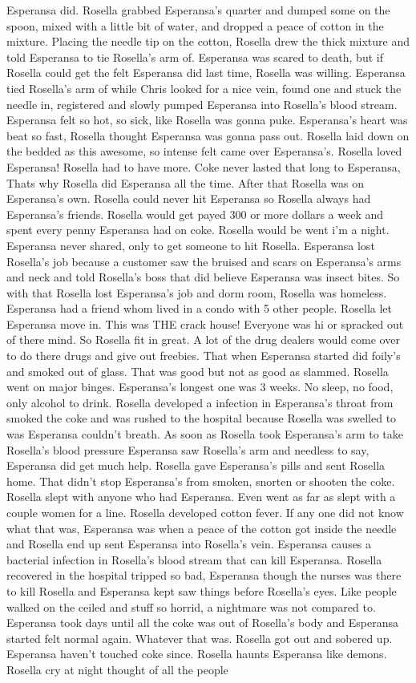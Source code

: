 \documentclass[12pt]{book}
\begin{document}
Esperansa did. Rosella grabbed Esperansa's quarter and dumped some on the spoon, mixed with a little bit of water, and dropped a peace of cotton in the mixture. Placing the needle tip on the cotton, Rosella drew the thick mixture and told Esperansa to tie Rosella's arm of. Esperansa was scared to death, but if Rosella could get the felt Esperansa did last time, Rosella was willing. Esperansa tied Rosella's arm of while Chris looked for a nice vein, found one and stuck the needle in, registered and slowly pumped Esperansa into Rosella's blood stream. Esperansa felt so hot, so sick, like Rosella was gonna puke. Esperansa's heart was beat so fast, Rosella thought Esperansa was gonna pass out. Rosella laid down on the bedded as this awesome, so intense felt came over Esperansa's. Rosella loved Esperansa! Rosella had to have more. Coke never lasted that long to Esperansa, Thats why Rosella did Esperansa all the time. After that Rosella was on Esperansa's own. Rosella could never hit Esperansa so Rosella always had Esperansa's friends. Rosella would get payed 300 or more dollars a week and spent every penny Esperansa had on coke. Rosella would be went i'm a night. Esperansa never shared, only to get someone to hit Rosella. Esperansa lost Rosella's job because a customer saw the bruised and scars on Esperansa's arms and neck and told Rosella's boss that did believe Esperansa was insect bites. So with that Rosella lost Esperansa's job and dorm room, Rosella was homeless. Esperansa had a friend whom lived in a condo with 5 other people. Rosella let Esperansa move in. This was THE crack house! Everyone was hi or spracked out of there mind. So Rosella fit in great. A lot of the drug dealers would come over to do there drugs and give out freebies. That when Esperansa started did foily's and smoked out of glass. That was good but not as good as slammed. Rosella went on major binges. Esperansa's longest one was 3 weeks. No sleep, no food, only alcohol to drink. Rosella developed a infection in Esperansa's throat from smoked the coke and was rushed to the hospital because Rosella was swelled to was Esperansa couldn't breath. As soon as Rosella took Esperansa's arm to take Rosella's blood pressure Esperansa saw Rosella's arm and needless to say, Esperansa did get much help. Rosella gave Esperansa's pills and sent Rosella home. That didn't stop Esperansa's from smoken, snorten or shooten the coke. Rosella slept with anyone who had Esperansa. Even went as far as slept with a couple women for a line. Rosella developed cotton fever. If any one did not know what that was, Esperansa was when a peace of the cotton got inside the needle and Rosella end up sent Esperansa into Rosella's vein. Esperansa causes a bacterial infection in Rosella's blood stream that can kill Esperansa. Rosella recovered in the hospital tripped so bad, Esperansa though the nurses was there to kill Rosella and Esperansa kept saw things before Rosella's eyes. Like people walked on the ceiled and stuff so horrid, a nightmare was not compared to. Esperansa took days until all the coke was out of Rosella's body and Esperansa started felt normal again. Whatever that was. Rosella got out and sobered up. Esperansa haven't touched coke since. Rosella haunts Esperansa like demons. Rosella cry at night thought of all the people 
\end{document}
